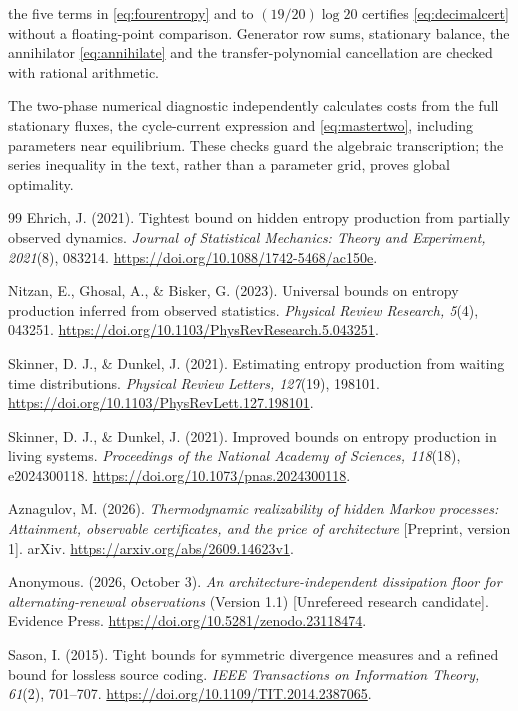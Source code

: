 \documentclass[11pt,a4paper]{article}
\theoremstyle{remark}\newtheorem{remark}[theorem]{Remark}
\begin{document}
the five terms in \eqref{eq:fourentropy} and to $(19/20)\log20$ certifies
\eqref{eq:decimalcert} without a floating-point comparison. Generator row
sums, stationary balance, the annihilator \eqref{eq:annihilate} and the
transfer-polynomial cancellation are checked with rational arithmetic.

The two-phase numerical diagnostic independently calculates costs from the
full stationary fluxes, the cycle-current expression and
\eqref{eq:mastertwo}, including parameters near equilibrium. These checks
guard the algebraic transcription; the series inequality in the text, rather
than a parameter grid, proves global optimality.

\begin{thebibliography}{99}
Ehrich, J. (2021). Tightest bound on hidden entropy production from partially
observed dynamics. \emph{Journal of Statistical Mechanics: Theory and
Experiment, 2021}(8), 083214.
\url{https://doi.org/10.1088/1742-5468/ac150e}.

Nitzan, E., Ghosal, A., \& Bisker, G. (2023). Universal bounds on entropy
production inferred from observed statistics. \emph{Physical Review Research,
5}(4), 043251. \url{https://doi.org/10.1103/PhysRevResearch.5.043251}.

Skinner, D. J., \& Dunkel, J. (2021). Estimating entropy production from waiting
time distributions. \emph{Physical Review Letters, 127}(19), 198101.
\url{https://doi.org/10.1103/PhysRevLett.127.198101}.

Skinner, D. J., \& Dunkel, J. (2021). Improved bounds on entropy production in
living systems. \emph{Proceedings of the National Academy of Sciences,
118}(18), e2024300118. \url{https://doi.org/10.1073/pnas.2024300118}.

Aznagulov, M. (2026). \emph{Thermodynamic realizability of hidden Markov
processes: Attainment, observable certificates, and the price of architecture}
[Preprint, version 1]. arXiv.
\url{https://arxiv.org/abs/2609.14623v1}.

Anonymous. (2026, October 3). \emph{An architecture-independent dissipation
floor for alternating-renewal observations} (Version 1.1) [Unrefereed research
candidate]. Evidence Press. \url{https://doi.org/10.5281/zenodo.23118474}.


Sason, I. (2015). Tight bounds for symmetric divergence measures and a refined
bound for lossless source coding. \emph{IEEE Transactions on Information
Theory, 61}(2), 701--707. \url{https://doi.org/10.1109/TIT.2014.2387065}.


\end{thebibliography}
\end{document}
